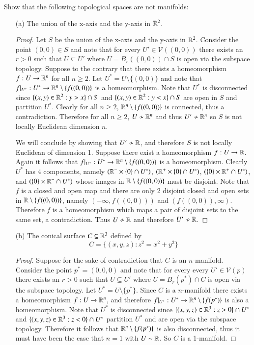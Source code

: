 \documentclass{homework651}
\begin{document}
\begin{problems}
\problem Show that the following topological spaces are not manifolds:
\begin{enumerate}
    \item[(a)] The union of the x-axis and the y-axis in $\RR^2$.
    \begin{proof} Let $S$ be the union of the x-axis and the y-axis in $\RR^2$. Consider the point $(0, 0) \in S$ and note that for every $U' \in \mathcal{V}((0,0))$ there exists an $r > 0$ such that $U \subseteq U'$ where $U = B_r((0, 0)) \cap S$ is open via the subspace topology.
        Suppose to the contrary that there exists a homeomorphism $f: U \to \RR^n$ for all $n \geq 2$. Let $U^* = U \setminus \{(0, 0)\}$
        and note that $f|_{U^*}: U^* \to \RR^n \setminus\{f((0, 0))\}$ is a homeomorphism. Note that $U^*$ is disconnected since $\{(x, y) \in \RR^2 : y > x\}\cap S$ and $\{(x, y) \in \RR^2 : y < x\}\cap S$ are open in $S$ and partition $U^*$. Clearly for all $n \geq 2$, $\RR^n \setminus\{f((0, 0))\}$ is connected, thus a contradiction. Therefore for all $n \geq 2$, $U \not\sim \RR^n$ and thus $U' \not\sim \RR^n$ so $S$ is not locally Euclidean dimension $n$.


    We will conclude by showing that $U' \not\sim \RR$, and therefore $S$ is not locally Euclidean of dimension 1. Suppose there exist
    a homeomorphism $f: U \to \RR$. Again it follows that $f|_{U^*}: U^* \to \RR^n \setminus\{f((0, 0))\}$ is a homeomorphism. Clearly 
    $U^*$ has 4 components, namely $(\RR^- \times \{0\} \cap U^*)$, $(\RR^+ \times \{0\} \cap U^*)$, $(\{0\}\times \RR^+ \cap U^*)$, and $(\{0\} \times \RR^- \cap U^*)$ whose images in $\RR \setminus \{f((0, 0))\}$ must be disjoint. Note that $f$ is a closed and open map and there are only 2 disjoint closed and open sets in $\RR \setminus \{f((0, 0))\}$, namely $(-\infty, f((0,0)))$ and $(f((0, 0)), \infty)$. Therefore $f$ is a homeomorphism which maps a pair of disjoint sets to the same set, a contradiction. Thus $U \not\sim \RR$ and therefore $U' \not\sim\RR$. 
    \end{proof}
    \item[(b)] The conical surface $C \subseteq \RR^3$ defined by 
    \begin{equation*}
        C = \{(x, y, z): z^2 = x^2 + y^2\}
    \end{equation*} 
    \begin{proof} Suppose for the sake of contradiction that $C$ is an $n$-manifold. Consider the point $p^* = (0, 0, 0)$ and note that for every every $U' \in \mathcal{V}(p)$ there exists an $r > 0$ such that $U \subseteq U'$ where $U = B_r(p^*) \cap C$ is open via the subspace topology. 
    Let $U^* = U \setminus \{p^*\}$. Since $C$ is a $n$-manifold there exists a homeomorphism $f:U \to \RR^n$, and therefore $f|_{U^*}: U^* \to \RR^n \setminus \{f(p^*)\}$ is also a homeomorphism. Note that $U^*$ is disconnected since $\{(x, y, z) \in \RR^3: z > 0\} \cap U^*$ and $\{(x, y, z) \in \RR^3: z < 0\} \cap U^*$ partition $U^*$ and are open via the subspace topology. Therefore it follows that $\RR^n \setminus \{f(p^*)\}$ is also disconnected, thus it must have been the case that $n = 1$ with $U \sim \RR$. So $C$ is a 1-manifold. 
    

\end{proof}
\end{enumerate}
\end{problems}
\end{document}
